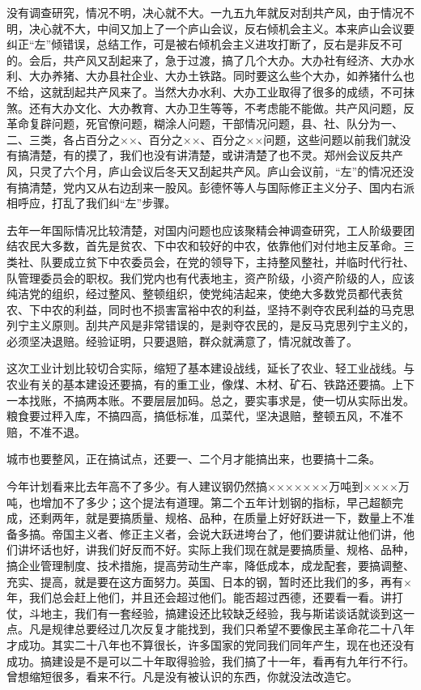 没有调查研究，情况不明，决心就不大。一九五九年就反对刮共产风，由于情况不明，决心就不大，中间又加上了一个庐山会议，反右倾机会主义。本来庐山会议要纠正“左”倾错误，总结工作，可是被右倾机会主义进攻打断了，反右是非反不可的。会后，共产风又刮起来了，急于过渡，搞了几个大办。大办社有经济、大办水利、大办养猪、大办县社企业、大办土铁路。同时要这么些个大办，如养猪什么也不给，这就刮起共产风来了。当然大办水利、大办工业取得了很多的成绩，不可抹煞。还有大办文化、大办教育、大办卫生等等，不考虑能不能做。共产风问题，反革命复辟问题，死官僚问题，糊涂人问题，干部情况问题，县、社、队分为一、二、三类，各占百分之××、百分之××、百分之××问题，这些问题以前我们就没有搞清楚，有的摸了，我们也没有讲清楚，或讲清楚了也不灵。郑州会议反共产风，只灵了六个月，庐山会议后冬天又刮起共产风。庐山会议前，“左”的情况还没有搞清楚，党内又从右边刮来一股风。彭德怀等人与国际修正主义分子、国内右派相呼应，打乱了我们纠“左”步骤。

去年一年国际情况比较清楚，对国内问题也应该聚精会神调查研究，工人阶级要团结农民大多数，首先是贫农、下中农和较好的中农，依靠他们对付地主反革命。三类社、队要成立贫下中农委员会，在党的领导下，主持整风整社，并临时代行社、队管理委员会的职权。我们党内也有代表地主，资产阶级，小资产阶级的人，应该纯洁党的组织，经过整风、整顿组织，使党纯洁起来，使绝大多数党员都代表贫农、下中农的利益，同时也不损害富裕中农的利益，坚持不剥夺农民利益的马克思列宁主义原则。刮共产风是非常错误的，是剥夺农民的，是反马克思列宁主义的，必须坚决退赔。经验证明，只要退赔，群众就满意了，情况就改善了。

这次工业计划比较切合实际，缩短了基本建设战线，延长了农业、轻工业战线。与农业有关的基本建设还要搞，有的重工业，像煤、木材、矿石、铁路还要搞。上下一本找账，不搞两本账。不要层层加码。总之，要实事求是，使一切从实际出发。粮食要过秤入库，不搞四高，搞低标准，瓜菜代，坚决退赔，整顿五风，不准不赔，不准不退。

城市也要整风，正在搞试点，还要一、二个月才能搞出来，也要搞十二条。

今年计划看来比去年高不了多少。有人建议钢仍然搞×××××××万吨到××××万吨，也增加不了多少；这个提法有道理。第二个五年计划钢的指标，早己超额完成，还剩两年，就是要搞质量、规格、品种，在质量上好好跃进一下，数量上不准备多搞。帝国主义者、修正主义者，会说大跃进垮台了，他们要讲就让他们讲，他们讲坏话也好，讲我们好反而不好。实际上我们现在就是要搞质量、规格、品种，搞企业管理制度、技术措施，提高劳动生产率，降低成本，成龙配套，要搞调整、充实、提高，就是要在这方面努力。英国、日本的钢，暂时还比我们的多，再有×年，我们总会赶上他们，并且还会超过他们。能否超过西德，还要看一看。讲打仗，斗地主，我们有一套经验，搞建设还比较缺乏经验，我与斯诺谈话就谈到这一点。凡是规律总要经过几次反复才能找到，我们只希望不要像民主革命花二十八年才成功。其实二十八年也不算很长，许多国家的党同我们同年产生，现在也还没有成功。搞建设是不是可以二十年取得验验，我们搞了十一年，看再有九年行不行。曾想缩短很多，看来不行。凡是没有被认识的东西，你就没法改造它。

